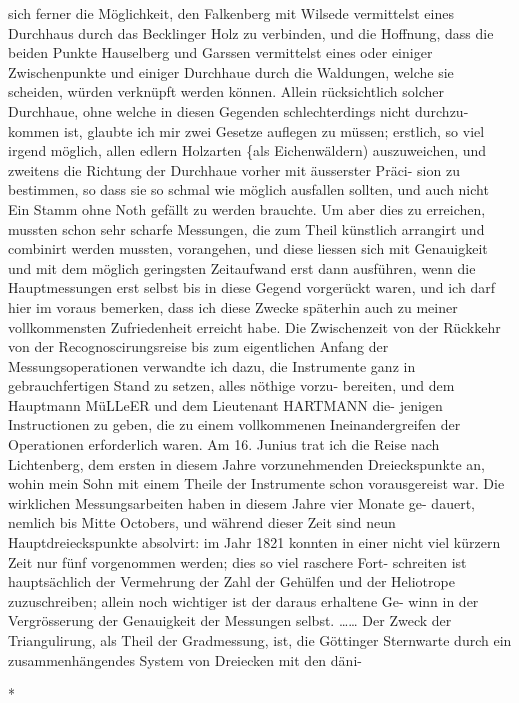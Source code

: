 \documentclass[12pt,a4paper]{article}
\theoremstyle{plain}
\theoremstyle{definition}
\theoremstyle{remark}
\begin{document}
\noindent

\noindent
sich ferner die Möglichkeit, den Falkenberg mit Wilsede vermittelst eines
Durchhaus durch das Becklinger Holz zu verbinden, und die Hoffnung, dass
die beiden Punkte Hauselberg und Garssen vermittelst eines oder einiger
Zwischenpunkte und einiger Durchhaue durch die Waldungen, welche sie
scheiden, würden verknüpft werden können. Allein rücksichtlich solcher
Durchhaue, ohne welche in diesen Gegenden schlechterdings nicht durchzu-
kommen ist, glaubte ich mir zwei Gesetze auflegen zu müssen; erstlich, so
viel irgend möglich, allen edlern Holzarten \{als Eichenwäldern) auszuweichen,
und zweitens die Richtung der Durchhaue vorher mit äusserster Präci-
sion zu bestimmen, so dass sie so schmal wie möglich ausfallen sollten, und
auch nicht Ein Stamm ohne Noth gefällt zu werden brauchte. Um aber
dies zu erreichen, mussten schon sehr scharfe Messungen, die zum Theil
künstlich arrangirt und combinirt werden mussten, vorangehen, und diese
liessen sich mit Genauigkeit und mit dem möglich geringsten Zeitaufwand erst
dann ausführen, wenn die Hauptmessungen erst selbst bis in diese Gegend
vorgerückt waren, und ich darf hier im voraus bemerken, dass ich diese
Zwecke späterhin auch zu meiner vollkommensten Zufriedenheit erreicht habe.
Die Zwischenzeit von der Rückkehr von der Recognoscirungsreise bis
zum eigentlichen Anfang der Messungsoperationen verwandte ich dazu, die
Instrumente ganz in gebrauchfertigen Stand zu setzen, alles nöthige vorzu-
bereiten, und dem Hauptmann MüLLeER und dem Lieutenant HARTMANN die-
jenigen Instructionen zu geben, die zu einem vollkommenen Ineinandergreifen
der Operationen erforderlich waren. Am 16. Junius trat ich die Reise nach
Lichtenberg, dem ersten in diesem Jahre vorzunehmenden Dreieckspunkte an,
wohin mein Sohn mit einem Theile der Instrumente schon vorausgereist war.
Die wirklichen Messungsarbeiten haben in diesem Jahre vier Monate ge-
dauert, nemlich bis Mitte Octobers, und während dieser Zeit sind neun
Hauptdreieckspunkte absolvirt: im Jahr 1821 konnten in einer nicht viel
kürzern Zeit nur fünf vorgenommen werden; dies so viel raschere Fort-
schreiten ist hauptsächlich der Vermehrung der Zahl der Gehülfen und der
Heliotrope zuzuschreiben; allein noch wichtiger ist der daraus erhaltene Ge-
winn in der Vergrösserung der Genauigkeit der Messungen selbst. \ldots\ldots
Der Zweck der Triangulirung, als Theil der Gradmessung, ist, die Göttinger
Sternwarte durch ein zusammenhängendes System von Dreiecken mit den däni-

*
\end{document}
